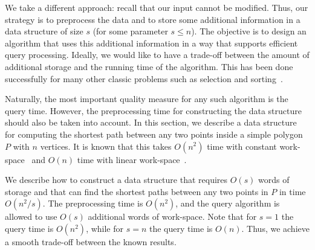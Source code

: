 \documentclass[11pt,a4paper]{article}
\newcommand{\marrow}{\marginpar[\hfill$\longrightarrow$]{$\longleftarrow$}}
\newcommand{\niceremark}[4]
   {\textcolor{#4}{\textsc{#1 #2:} \marrow\textsf{#3}}}
\newcommand{\wolfgang}[2][says]{\niceremark{Wolfgang}{#1}{#2}{red}}
\begin{document}
We take a different approach: recall that our input
cannot be modified. Thus, our strategy is to
preprocess the data and to store some additional information
in a data structure of size $s$ (for some parameter $s \leq n$).
The objective is to design an algorithm that uses this additional
information in a way that supports efficient query processing.
Ideally, we would like to have a trade-off between the amount of additional
storage and the running time of the algorithm. This has been done
successfully for many other classic problems such as selection and
sorting~\cite{MunroRa96,RamanRa98}.


Naturally, the most important quality measure for any such algorithm is the
query time. However, the preprocessing
time for constructing the data structure should also be taken into account. In
this section, we describe a data structure for computing the shortest path
between any two points inside a simple polygon $P$ with $n$ vertices.
It is known that this takes $O(n^2)$ time with constant
work-space~\cite{AsanoMuRoWa11}  and $O(n)$ time  with
linear work-space~\cite{GuiHers89}.

\iffalse
\wolfgang{Added a new definition by Tetsuo to the SVN. Not integrated yet.}
Definition of a memory adjustable data structure

\begin{itemize}
\item Input data of $O(n \log n)$ bits are stored in a
read-only array.
\item The size of a data structure is bounded by $O(s \log n)$
bits for a parameter $s \in \{1, \ldots, n\}$.
\item An algorithm for constructing the data structure can
use work space of $O(n \log n)$ bits.
\item Query algorithms for answering fixed types of queries
on the input set can use work space of $O(s \log n)$ bits.
\end{itemize}

A memory adjustable data structure should be evaluated by
\begin{itemize}
\item time complexity of the construction algorithm, and
\item time complexities of the query algorithms.
\end{itemize}
\fi

We describe how to construct a data structure that requires $O(s)$
words of storage and that can find the shortest paths between any two
points in $P$ in time $O(n^2/s)$. The preprocessing time is $O(n^2)$, and
the query algorithm is allowed to use $O(s)$ additional words of work-space.
Note that for $s=1$ the query time is $O(n^2)$, while for
$s = n$ the query time is $O(n)$. Thus, we achieve a smooth trade-off between
the known results.
\end{document}
